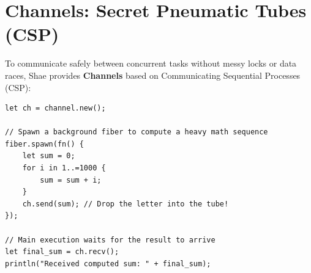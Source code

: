 \section{Channels: Secret Pneumatic Tubes (CSP)}

To communicate safely between concurrent tasks without messy locks or data races, Shae provides \textbf{Channels} based on Communicating Sequential Processes (CSP):

\begin{lstlisting}[language=shaelang]
let ch = channel.new();

// Spawn a background fiber to compute a heavy math sequence
fiber.spawn(fn() {
    let sum = 0;
    for i in 1..=1000 {
        sum = sum + i;
    }
    ch.send(sum); // Drop the letter into the tube!
});

// Main execution waits for the result to arrive
let final_sum = ch.recv();
println("Received computed sum: " + final_sum);
\end{lstlisting}
